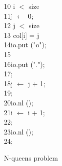 \begin{appendix}
\begin{Program}
\begin{ttlprog}
10\>\>\ttlWhile{} i $<$ size \ttlDo{}\\
11\>\>\>j $\leftarrow$ 0;\\
12\>\>\>\ttlWhile{} j $<$ size \ttlDo{}\\
13\>\>\>\>\ttlIf{} col[i] = j \ttlThen{}\\
14\>\>\>\>\>io.put ("o");\\
15\>\>\>\>\ttlElse{}\\
16\>\>\>\>\>io.put (".");\\
17\>\>\>\>\ttlEnd{};\\
18\>\>\>\>j $\leftarrow$ j $+$ 1;\\
19\>\>\>\ttlEnd{};\\
20\>\>\>io.nl ();\\
21\>\>\>i $\leftarrow$ i $+$ 1;\\
22\>\>\ttlEnd{};\\
23\>\>io.nl ();\\
24\>\ttlEnd{};
\end{ttlprog}
\caption{N-queens problem}
\label{prog:example-queens1}
\end{Program}


\end{appendix}
